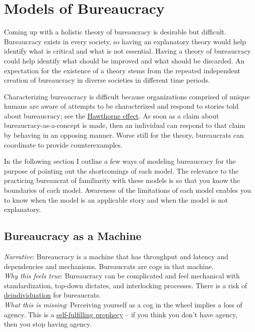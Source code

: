 \section{Models of Bureaucracy\label{sec:models-of-bureaucracy}}

Coming up with a holistic theory of bureaucracy is desirable but difficult. Bureaucracy exists in every society, so having an explanatory theory would help identify what is critical and what is not essential. Having a theory of bureaucracy could help identify what should be improved and what should be discarded. An expectation for the existence of a theory stems from the repeated independent creation of bureaucracy in diverse societies in different time periods. 

Characterizing bureaucracy is difficult because organizations comprised of unique humans are aware of attempts to be characterized and respond to stories told about bureaucracy; see the \href{https://en.wikipedia.org/wiki/Hawthorne_effect}{Hawthorne effect}. As soon as a claim about bureaucracy-as-a-concept is made, then an individual can respond to that claim by behaving in an opposing manner. Worse still for the theory, bureaucrats can coordinate to provide counterexamples. 

In the following section I outline a few ways of modeling bureaucracy for the purpose of pointing out the shortcomings of each model. The relevance to the practicing bureaucrat of familiarity with these models is so that you know the boundaries of each model. Awareness of the limitations of each model enables you to know when the model is an applicable story and when the model is not explanatory. 

\subsection{Bureaucracy as a Machine}

\textit{Narrative}: Bureaucracy is a machine that has throughput and latency and dependencies and mechanisms. Bureaucrats are cogs in that machine.\\
\textit{Why this feels true}: Bureaucracy can be complicated and feel mechanical with standardization, top-down dictates, and interlocking processes. There is a risk of \href{https://en.wikipedia.org/wiki/Deindividuation}{deindividuation} for bureaucrats. \\
\textit{What this is missing}: Perceiving yourself as a cog in the wheel implies a loss of agency. This is a \href{https://en.wikipedia.org/wiki/Self-fulfilling_prophecy}{self-fulfilling prophecy} -- if you think you don't have agency, then you stop having agency. 

